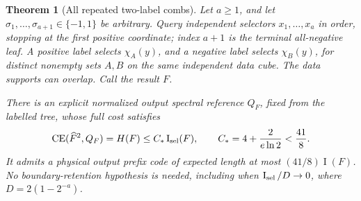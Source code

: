 \documentclass{article}
\newtheorem{theorem}{Theorem}
\newcommand{\CE}{\operatorname{CE}}
\newcommand{\I}{\operatorname{I}}
\begin{document}
\begin{theorem}[All repeated two-label combs]
Let $a\ge1$, and let $\sigma_1,\ldots,\sigma_{a+1}\in\{-1,1\}$
be arbitrary. Query independent selectors $x_1,\ldots,x_a$ in order,
stopping at the first positive coordinate; index $a+1$ is the terminal
all-negative leaf. A positive label selects $\chi_A(y)$, and a negative
label selects $\chi_B(y)$, for distinct nonempty sets $A,B$ on the same
independent data cube. The data supports can overlap. Call the result $F$.

There is an explicit normalized output spectral reference $Q_F$, fixed
from the labelled tree, whose full cost satisfies
\[
 \CE(\widehat F^2,Q_F)=H(F)
 \le C_*\I_{\rm sel}(F),\qquad
 C_*=4+\frac{2}{e\ln2}<\frac{41}{8}.
\]
It admits a physical output prefix code of expected length at most
$(41/8)\I(F)$. No boundary-retention hypothesis is needed, including when
$\I_{\rm sel}/D\to0$, where $D=2(1-2^{-a})$.
\end{theorem}
\end{document}
